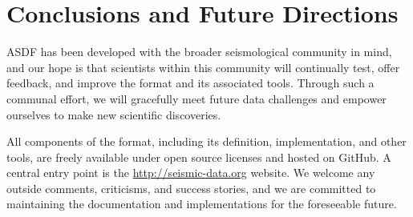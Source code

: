 \section{Conclusions and Future Directions}

ASDF has been developed with the broader seismological community in mind, and
our hope is that scientists within this community will continually test, offer
feedback, and improve the format and its associated tools.  Through such a
communal effort, we will gracefully meet future data challenges and empower
ourselves to make new scientific discoveries.

All components of the format, including its definition, implementation, and
other tools, are freely available under open source licenses and hosted on
GitHub. A central entry point is the \url{http://seismic-data.org} website. We
welcome any outside comments, criticisms, and success stories, and we are
committed to maintaining the documentation and implementations for the foreseeable
future.
